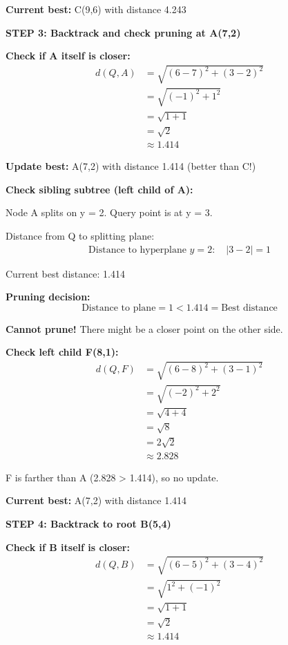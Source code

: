\documentclass[12pt]{article}
\begin{document}
\begin{solution}
\textbf{Current best:} C(9,6) with distance 4.243

\textbf{STEP 3: Backtrack and check pruning at A(7,2)}

\textbf{Check if A itself is closer:}
\begin{align*}
d(Q, A) &= \sqrt{(6-7)^2 + (3-2)^2} \\
&= \sqrt{(-1)^2 + 1^2} \\
&= \sqrt{1 + 1} \\
&= \sqrt{2} \\
&\approx 1.414
\end{align*}

\textbf{Update best:} A(7,2) with distance 1.414 (better than C!)

\textbf{Check sibling subtree (left child of A):}

Node A splits on y = 2. Query point is at y = 3.

Distance from Q to splitting plane:
\begin{align*}
\text{Distance to hyperplane } y=2: \quad |3 - 2| = 1
\end{align*}

Current best distance: 1.414

\textbf{Pruning decision:}
\[
\text{Distance to plane} = 1 < 1.414 = \text{Best distance}
\]

\textbf{Cannot prune!} There might be a closer point on the other side.

\textbf{Check left child F(8,1):}
\begin{align*}
d(Q, F) &= \sqrt{(6-8)^2 + (3-1)^2} \\
&= \sqrt{(-2)^2 + 2^2} \\
&= \sqrt{4 + 4} \\
&= \sqrt{8} \\
&= 2\sqrt{2} \\
&\approx 2.828
\end{align*}

F is farther than A (2.828 > 1.414), so no update.

\textbf{Current best:} A(7,2) with distance 1.414

\textbf{STEP 4: Backtrack to root B(5,4)}

\textbf{Check if B itself is closer:}
\begin{align*}
d(Q, B) &= \sqrt{(6-5)^2 + (3-4)^2} \\
&= \sqrt{1^2 + (-1)^2} \\
&= \sqrt{1 + 1} \\
&= \sqrt{2} \\
&\approx 1.414
\end{align*}


\end{solution}
\end{document}
